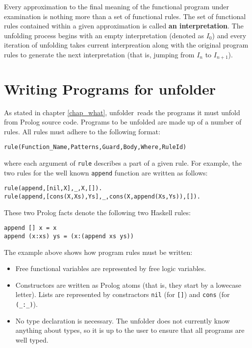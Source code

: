 \documentclass[11pt,a4paper,twoside,openright]{book}
\newcommand{\unfolder}{{\textsf{unfolder~}}}
\begin{document}
Every approximation to the final meaning of the functional program
under examination is nothing more than a set of functional rules. The
set of functional rules contained within a given approximation is
called {\bf an interpretation}. The unfolding process begins with an
empty interpretation (denoted as $I_0$) and every iteration of
unfolding takes current interpreation along with the original program
rules to generate the next interpretation (that is, jumping from $I_n$
to $I_{n+1}$). 

\chapter{Writing Programs for \unfolder}
\label{chap_writing_programs}

As stated in chapter \ref{chap_what}, \unfolder reads the programs it
must unfold from Prolog source code. Programs to be unfolded are made
up of a number of rules. All rules must adhere to the following
format:

\begin{center}
{\tt rule(Function\_Name,Patterns,Guard,Body,Where,RuleId)}
\end{center}

\noindent
where each argument of {\tt rule} describes a part of a given
rule. For example, the two rules for the well known {\tt append}
function are written as follows:

\begin{verbatim}
rule(append,[nil,X],_,X,[]).
rule(append,[cons(X,Xs),Ys],_,cons(X,append(Xs,Ys)),[]).
\end{verbatim} 

\noindent
These two Prolog facts denote the following two Haskell rules:

\begin{verbatim}
append [] x = x
append (x:xs) ys = (x:(append xs ys))
\end{verbatim}

\noindent
The example above shows how program rules must be written:

\begin{itemize}
\item
Free functional variables are represented by free logic variables.

\item
Constructors are written as Prolog atoms (that is, they start by a
lowecase letter). Lists are represented by constractors {\tt nil} (for
{\tt []}) and {\tt cons} (for {\tt (\_:\_)}).

\item
No type declaration is necessary. The unfolder does not currently know
anything about types, so it is up to the user to ensure that all programs
are well typed.
\end{itemize}
\end{document}

